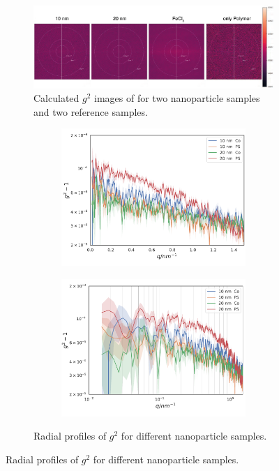 \begin{figure}
	\centering
	\begin{subfigure}[b]{0.8\textwidth}
		\includegraphics[width=\linewidth]{images/resultnano2dr.pdf}
		\caption{Calculated $g^2$ images of for two nanoparticle samples and two reference samples.}
		\label{fig:resnano2d}
	\end{subfigure}
	\begin{subfigure}[b]{\textwidth}
		\begin{subfigure}[b]{0.49\textwidth}
			\includegraphics[width=\linewidth]{images/nano.pdf}
		\end{subfigure}
		\begin{subfigure}[b]{0.49\textwidth}
			\includegraphics[width=\linewidth]{images/nano_loglog.pdf}
		\end{subfigure}
		\caption{Radial profiles of $g^2$ for different nanoparticle samples.}
		\label{fig:resnanorad}
	\end{subfigure}


\end{figure}
